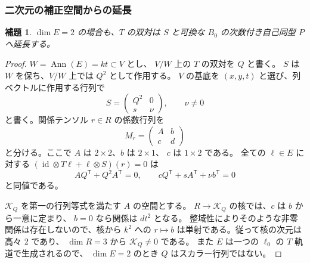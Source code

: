 \documentclass[11pt,a4paper]{ltjsarticle}
\newtheorem{lemma}[theorem]{補題}
\theoremstyle{definition}
\begin{document}
\subsubsection{二次元の補正空間からの延長}
\begin{lemma}\label{n3desc:lem:two-dimensional-extension}
$\dim E=2$ の場合も、$T$ の双対は $S$ と可換な
$B_0$ の次数付き自己同型 $P$ へ延長する。
\end{lemma}
\begin{proof}
$W=\operatorname{Ann}(E)=kt\subset V$ とし、
$V/W$ 上の $T$ の双対を $Q$ と書く。
$S$ は $W$ を保ち、$V/W$ 上では $Q^2$ として作用する。
$V$ の基底を $(x,y,t)$ と選び、列ベクトルに作用する行列で
\[
S=\begin{pmatrix}Q^2&0\\s&\nu\end{pmatrix},\qquad\nu\ne0
\]
と書く。関係テンソル $r\in R$ の係数行列を
\[
M_r=\begin{pmatrix}A&b\\c&d\end{pmatrix}
\]
と分ける。ここで $A$ は $2\times2$、$b$ は $2\times1$、
$c$ は $1\times2$ である。
全ての $\ell\in E$ に対する
$(\operatorname{id}\otimes T\ell+\ell\otimes S)(r)=0$ は
\begin{equation}\label{nzred:eq:block-constraints}
A Q^{\mathsf T}+Q^2 A^{\mathsf T}=0,\qquad
c Q^{\mathsf T}+s A^{\mathsf T}+\nu b^{\mathsf T}=0
\end{equation}
と同値である。

$\mathcal K_Q$ を第一の行列等式を満たす $A$ の空間とする。
$R\to\mathcal K_Q$ の核では、$c$ は $b$ から一意に定まり、
$b=0$ なら関係は $dt^2$ となる。
整域性によりそのような非零関係は存在しないので、核から $k^2$ への
$r\mapsto b$ は単射である。従って核の次元は高々 2 であり、
$\dim R=3$ から $\mathcal K_Q\ne0$ である。
また $E$ は一つの $\ell_0$ の $T$ 軌道で生成されるので、
$\dim E=2$ のとき $Q$ はスカラー行列ではない。


\end{proof}
\end{document}
